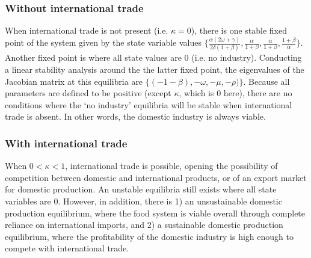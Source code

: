 \documentclass[12pt]{article}
\begin{document}
\subsubsection{Without international trade}
When international trade is not present (i.e. $\kappa = 0$), there is one stable fixed point of the system given by the state variable values $\big \{\frac{\alpha(2\omega + \gamma)}{2 \delta (1 + \beta)}, \frac{\alpha}{1 + \beta}, \frac{\alpha}{1 + \beta}, \frac{1 + \beta}{\alpha}\big\}$. Another fixed point is where all state values are 0 (i.e. no industry). Conducting a linear stability analysis around the the latter fixed point, the eigenvalues of the Jacobian matrix at this equilibria are $\{(-1 - \beta), - \omega, - \mu, - \rho)\}$.
Because all parameters are defined to be positive (except $\kappa$, which is $0$ here), there are no conditions where the `no industry' equilibria will be stable when international trade is absent. In other words, the domestic industry is always viable.

\iffalse
The Jacbobian matrix ($\boldsymbol{J}$) at this equilibria evalutes to:

\begin{equation}
  \boldsymbol{J} \Big |_{\{\frac{\alpha(2\omega + \gamma)}{2 \delta (1 + \beta)}, \frac{\alpha}{1 + \beta}, \frac{\alpha}{1 + \beta}, \frac{1 + \beta}{\alpha}\}} =
  \begin{pmatrix}
    0   &    0     &  0 &  \frac{\alpha^2(2 \omega + \gamma)}{2 \delta (1 + \beta)} \\
    \delta & - \omega - \frac{\gamma}{4}  &  - \frac{\gamma}{4} & 0 \\
    0      &           0            & -\mu     & - \mu (\frac{\alpha}{1+\beta})^2\\
    0      &   - \rho (\frac{1 + \beta}{\alpha})^2    & \rho (\frac{1+\beta}{\alpha})^2 & 0 \\
  \end{pmatrix}
\end{equation}
\fi

\subsubsection{With international trade}
When $0 < \kappa < 1$, international trade is possible, opening the possibility of competition between domestic and international products, or of an export market for domestic production. An unstable equilibria still exists where all state variables are 0. However, in addition, there is 1) an unsustainable domestic production equilibrium, where the food system is viable overall through complete reliance on international imports, and 2) a sustainable domestic production equilibrium, where the profitability of the domestic industry is high enough to compete with international trade.
\end{document}
